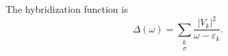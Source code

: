 \documentclass{article}
\begin{document}
The hybridization function is
\begin{equation}
\Delta(\omega) = \sum_{\substack{k \\ \sigma}} \frac{|V_{k}|^2}{\omega - \varepsilon_{k}} .
\label{eq:hyb}
\end{equation}
\end{document}
